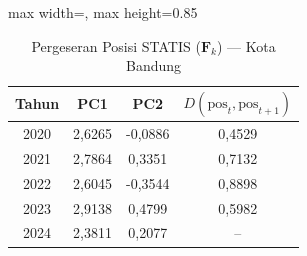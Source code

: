 \begin{table}[H]
\centering
\caption{Pergeseran Posisi STATIS ($\mathbf{F}_k$) --- Kota Bandung} \label{tab:app2jarak_statis_skor_kota_bandung}
\begin{adjustbox}{max width=\textwidth, max height=0.85\textheight}
\begin{tabular}{|c|c|c|c|}
\hline
\textbf{Tahun} & \textbf{PC1} & \textbf{PC2} & \textbf{$D(\text{pos}_t, \text{pos}_{t+1})$} \\
\hline
2020 & 2,6265 & -0,0886 & 0,4529 \\
2021 & 2,7864 & 0,3351 & 0,7132 \\
2022 & 2,6045 & -0,3544 & 0,8898 \\
2023 & 2,9138 & 0,4799 & 0,5982 \\
2024 & 2,3811 & 0,2077 & -- \\
\hline
\end{tabular}
\end{adjustbox}
\end{table}